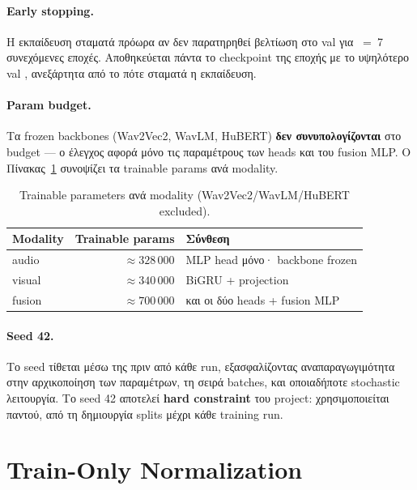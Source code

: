 \paragraph{Early stopping.}
Η εκπαίδευση σταματά πρόωρα αν δεν παρατηρηθεί βελτίωση
στο val \AUC{} για ~=~7 συνεχόμενες εποχές.
Αποθηκεύεται πάντα το checkpoint της εποχής
με το υψηλότερο val \AUC{},
ανεξάρτητα από το πότε σταματά η εκπαίδευση.

\paragraph{Param budget.}
Τα frozen backbones (Wav2Vec2, WavLM, HuBERT)
\textbf{δεν συνυπολογίζονται} στο budget —
ο έλεγχος αφορά μόνο τις παραμέτρους
των heads και του fusion MLP.
Ο Πίνακας~\ref{tab:param_budget} συνοψίζει
τα trainable params ανά modality.

\begin{table}[ht]
  \centering
  \begin{tabular}{lrl}
    \toprule
    Modality & Trainable params & Σύνθεση \\
    \midrule
    audio  & ${\approx}328\,000$ & MLP head μόνο· backbone frozen \\
    visual & ${\approx}340\,000$ & BiGRU + projection \\
    fusion & ${\approx}700\,000$ & και οι δύο heads + fusion MLP \\
    \bottomrule
  \end{tabular}
  \caption{Trainable parameters ανά modality
    (Wav2Vec2/WavLM/HuBERT excluded).}
  \label{tab:param_budget}
\end{table}

\paragraph{Seed 42.}
Το seed τίθεται μέσω της 
πριν από κάθε run,
εξασφαλίζοντας αναπαραγωγιμότητα
στην αρχικοποίηση των παραμέτρων,
τη σειρά batches, και οποιαδήποτε stochastic λειτουργία.
Το seed 42 αποτελεί \textbf{hard constraint} του project:
χρησιμοποιείται παντού, από τη δημιουργία splits
μέχρι κάθε training run.

\section{Train-Only Normalization}
\label{sec:normalization}

